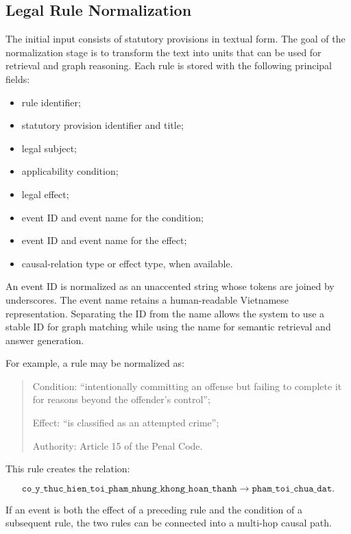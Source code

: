 \subsection{Legal Rule Normalization}

The initial input consists of statutory provisions in textual form. The goal
of the normalization stage is to transform the text into units that can be
used for retrieval and graph reasoning. Each rule is stored with the
following principal fields:

\begin{itemize}
    \item rule identifier;
    \item statutory provision identifier and title;
    \item legal subject;
    \item applicability condition;
    \item legal effect;
    \item event ID and event name for the condition;
    \item event ID and event name for the effect;
    \item causal-relation type or effect type, when available.
\end{itemize}

An event ID is normalized as an unaccented string whose tokens are joined by
underscores. The event name retains a human-readable Vietnamese
representation. Separating the ID from the name allows the system to use a
stable ID for graph matching while using the name for semantic retrieval and
answer generation.

For example, a rule may be normalized as:

\begin{quote}
Condition: ``intentionally committing an offense but failing to complete it
for reasons beyond the offender's control'';

Effect: ``is classified as an attempted crime'';

Authority: Article 15 of the Penal Code.
\end{quote}

This rule creates the relation:

\[
\texttt{co\_y\_thuc\_hien\_toi\_pham\_nhung\_khong\_hoan\_thanh}
\rightarrow
\texttt{pham\_toi\_chua\_dat}.
\]

If an event is both the effect of a preceding rule and the condition of a
subsequent rule, the two rules can be connected into a multi-hop causal path.

